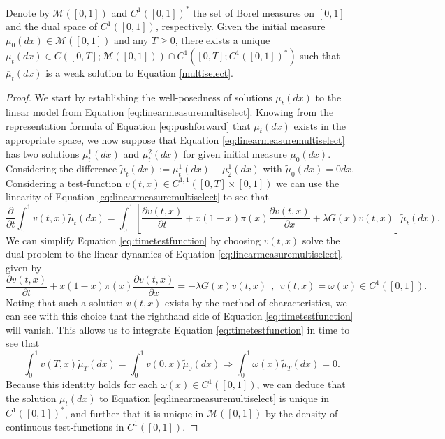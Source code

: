 \documentclass[11pt]{article}
\numberwithin{equation}{section}
\newcommand{\mc}{\mathcal}
\newcommand{\ol}{\overline}
\newcommand{\dsdel}[2]{\displaystyle\frac{\partial #1}{\partial #2}}
\begin{document}
{\begin{proposition} \label{prop:wellposedness}
Denote by $\mc{M}([0,1])$ and $C^1([0,1])^*$ the set of Borel measures on $[0,1]$ and the dual space of $C^1([0,1])$, respectively. Given the initial measure $\mu_0(dx) \in \mc{M}([0,1])$ and any $T \geq 0$, there exists a unique $\ol{\mu}_t(dx) \in C\left(\left[0,T\right]; \mc{M}([0,1]) \right) \cap C^1\left(\left[0,T\right] ;C^1([0,1])^*  \right)$ such that $\ol{\mu}_t(dx)$ is a weak solution to Equation \eqref{multiselect}. 
\end{proposition}
\begin{proof}
 We start by establishing the well-posedness of solutions $\mu_t(dx)$ to the linear model from Equation \eqref{eq:linearmeasuremultiselect}. Knowing from the representation formula of Equation \eqref{eq:pushforward} that $\mu_t(dx)$ exists in the appropriate space, we now suppose that Equation \eqref{eq:linearmeasuremultiselect} has two solutions $\mu_t^1(dx)$ and $\mu_t^2(dx)$ for given initial measure $\mu_0(dx)$. Considering the difference $\tilde{\mu}_t(dx) := \mu_t^1(dx) - \mu_2^1(dx)$ with $\tilde{\mu}_0(dx) = 0dx$. Considering a test-function $v(t,x) \in C^{1,1}\left([0,T] \times [0,1] \right)$ we can use the linearity of Equation \eqref{eq:linearmeasuremultiselect} to see that
 \begin{dmath} \label{eq:timetestfunction}
 \dsdel{}{t} \int_0^1 v(t,x) \tilde{\mu}_t(dx) = \int_0^1 \left[\dsdel{v(t,x)}{t} +  x (1-x) \pi(x) \dsdel{v(t,x)}{x} + \lambda G(x) v(t,x)  \right] \tilde{\mu}_t(dx).
 \end{dmath}
 We can simplify Equation \eqref{eq:timetestfunction} by choosing $v(t,x)$ solve the dual problem to the linear dynamics of Equation \eqref{eq:linearmeasuremultiselect}, given by
 \begin{equation} \label{eq:dualpde}
     \dsdel{v(t,x)}{t} + x (1-x) \pi(x) \dsdel{v(t,x)}{x} = - \lambda G(x) v(t,x) \: \:, \: \: v(t,x) = \omega(x) \in C^1([0,1]).
 \end{equation}
Noting that such a solution $v(t,x)$ exists by the method of characteristics, we can see with this choice that the righthand side of Equation \eqref{eq:timetestfunction} will vanish. This allows us to integrate Equation \eqref{eq:timetestfunction} in time to see that
\begin{equation}
    \int_0^1 v(T,x) \tilde{\mu}_T(dx) = \int_0^1 v(0,x) \tilde{\mu}_0(dx) \Longrightarrow \int_0^1 \omega(x) \tilde{\mu}_T(dx) = 0.
\end{equation}
Because this identity holds for each $\omega(x) \in C^1\left(\left[0,1\right]\right)$, we can deduce that the solution $\mu_t(dx)$ to Equation \eqref{eq:linearmeasuremultiselect} is unique in $C^1([0,1])^*$, and further that it is unique in $\mc{M}([0,1])$ by the density of continuous test-functions in $C^1([0,1])$.  


\end{proof}}
\end{document}
